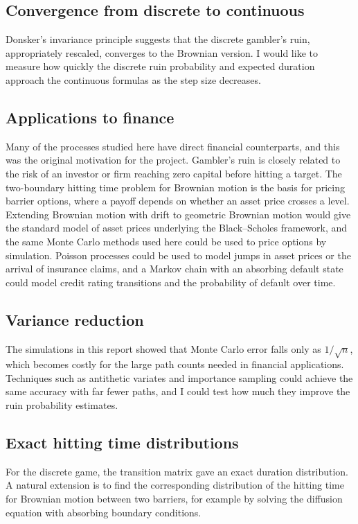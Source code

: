 \documentclass[11pt,a4paper]{article}
\begin{document}
\subsection*{Convergence from discrete to continuous}
Donsker's invariance principle suggests that the discrete gambler's ruin, appropriately rescaled, converges to the Brownian version. I would like to measure how quickly the discrete ruin probability and expected duration approach the continuous formulas as the step size decreases.

\subsection*{Applications to finance}
Many of the processes studied here have direct financial counterparts, and this was the original motivation for the project. Gambler's ruin is closely related to the risk of an investor or firm reaching zero capital before hitting a target. The two-boundary hitting time problem for Brownian motion is the basis for pricing barrier options, where a payoff depends on whether an asset price crosses a level. Extending Brownian motion with drift to geometric Brownian motion would give the standard model of asset prices underlying the Black--Scholes framework, and the same Monte Carlo methods used here could be used to price options by simulation. Poisson processes could be used to model jumps in asset prices or the arrival of insurance claims, and a Markov chain with an absorbing default state could model credit rating transitions and the probability of default over time.

\subsection*{Variance reduction}
The simulations in this report showed that Monte Carlo error falls only as $1/\sqrt{n}$, which becomes costly for the large path counts needed in financial applications. Techniques such as antithetic variates and importance sampling could achieve the same accuracy with far fewer paths, and I could test how much they improve the ruin probability estimates.

\subsection*{Exact hitting time distributions}
For the discrete game, the transition matrix gave an exact duration distribution. A natural extension is to find the corresponding distribution of the hitting time for Brownian motion between two barriers, for example by solving the diffusion equation with absorbing boundary conditions.
\end{document}
